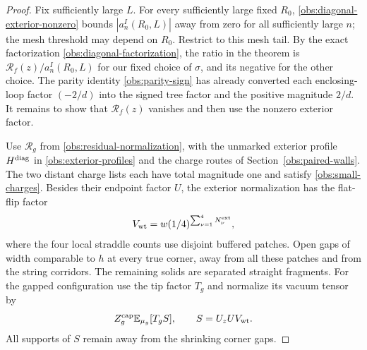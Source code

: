 \begin{proof}
Fix sufficiently large $L$.  For every sufficiently large fixed $R_0$,
\eqref{obs:diagonal-exterior-nonzero} bounds $|a_n^I(R_0,L)|$ away
from zero for all sufficiently large $n$; the mesh threshold may
depend on $R_0$.  Restrict to this mesh tail.
By the exact factorization \eqref{obs:diagonal-factorization}, the
ratio in the theorem is $\mathcal R_f(z)/a_n^I(R_0,L)$ for our fixed
choice of $\sigma$, and its negative for the other choice.  The
parity identity \eqref{obs:parity-sign} has already converted each
enclosing-loop factor $(-2/d)$ into the signed tree factor and the
positive magnitude $2/d$.  It remains to show that $\mathcal R_f(z)$
vanishes and then use the nonzero exterior factor.

Use $\mathcal R_g$ from \eqref{obs:residual-normalization}, with the
unmarked exterior profile $H^{\rm diag}$ in
\eqref{obs:exterior-profiles} and the charge routes of
Section~\ref{obs:paired-walls}.  The two distant charge lists each
have total magnitude one and satisfy \eqref{obs:small-charges}.
Besides their endpoint factor $U$, the exterior normalization has
the flat-flip factor
\begin{equation}
 V_{\rm wt}=w(1/4)^{\sum_{\nu=1}^4N^{\rm ext}_\nu},
 \label{obs:quarter-tilt}
\end{equation}
where the four local straddle counts use disjoint buffered patches.
Open gaps of width comparable to $h$ at every true corner, away from
all these patches and from the string corridors.  The remaining solids
are separated straight fragments.  For the gapped configuration use
the tip factor $T_g$ and normalize its vacuum tensor by
\begin{equation}
 Z_g^{\rm cap}\mathbb E_{\mu_g}[T_g S],\qquad
 S=U_z U V_{\rm wt}.
 \label{obs:residual-normalizer}
\end{equation}
All supports of $S$ remain away from the shrinking corner gaps.


\end{proof}
